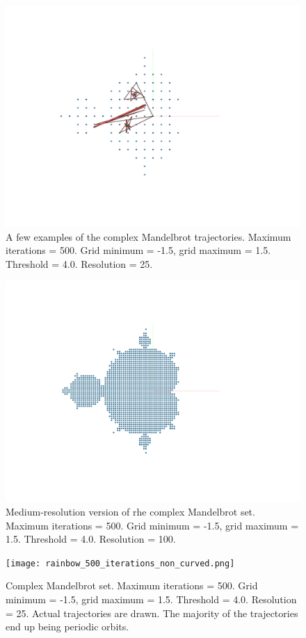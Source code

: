 \documentclass[12pt]{article}
\begin{document}
\begin{figure} 
\centering
  \includegraphics[width = 5 in]{sample_trajectories.png}	
  \caption{A few examples of the complex Mandelbrot trajectories.
Maximum iterations = 500.
Grid minimum = -1.5, grid maximum = 1.5.
Threshold = 4.0.
Resolution = 25.
}
\end{figure}


\begin{figure} 
\centering
  \includegraphics[width = 5 in]{set2.png}	
  \caption{Medium-resolution version of rhe complex Mandelbrot set.
Maximum iterations = 500.
Grid minimum = -1.5, grid maximum = 1.5.
Threshold = 4.0.
Resolution = 100.
}
\end{figure}


\begin{figure} 
\centering
  \texttt{[image: rainbow\_500\_iterations\_non\_curved.png]}	
  \caption{Complex Mandelbrot set.
Maximum iterations = 500.
Grid minimum = -1.5, grid maximum = 1.5.
Threshold = 4.0.
Resolution = 25.
Actual trajectories are drawn.
The majority of the trajectories end up being periodic orbits.}
\end{figure}
\end{document}
